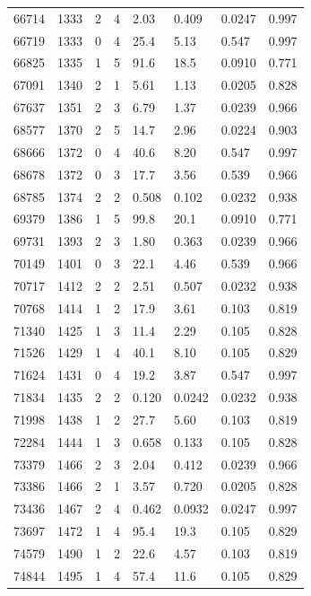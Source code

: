 \documentclass[preview]{standalone}
\begin{document}
{{{{{{{\begin{tabular}{L{1.2cm}C{1.2cm} C{0.3cm}C{0.5cm} C{1.4cm}C{1.4cm} C{1.4cm}C{1.4cm}}
  66714  &  1333  & 2     &  4 &  2.03  & 0.409  & 0.0247 &  0.997   \\ 
  66719  &  1333  & 0     &  4 &  25.4  & 5.13  & 0.547 &  0.997   \\ 
  66825  &  1335  & 1     &  5 &  91.6  & 18.5  & 0.0910 &  0.771   \\ 
  67091  &  1340  & 2     &  1 &  5.61  & 1.13  & 0.0205 &  0.828   \\ 
  67637  &  1351  & 2     &  3 &  6.79  & 1.37  & 0.0239 &  0.966   \\ 
  68577  &  1370  & 2     &  5 &  14.7  & 2.96  & 0.0224 &  0.903   \\ 
  68666  &  1372  & 0     &  4 &  40.6  & 8.20  & 0.547 &  0.997   \\ 
  68678  &  1372  & 0     &  3 &  17.7  & 3.56  & 0.539 &  0.966   \\ 
  68785  &  1374  & 2     &  2 &  0.508  & 0.102  & 0.0232 &  0.938   \\ 
  69379  &  1386  & 1     &  5 &  99.8  & 20.1  & 0.0910 &  0.771   \\ 
  69731  &  1393  & 2     &  3 &  1.80  & 0.363  & 0.0239 &  0.966   \\ 
  70149  &  1401  & 0     &  3 &  22.1  & 4.46  & 0.539 &  0.966   \\ 
  70717  &  1412  & 2     &  2 &  2.51  & 0.507  & 0.0232 &  0.938   \\ 
  70768  &  1414  & 1     &  2 &  17.9  & 3.61  & 0.103 &  0.819   \\ 
  71340  &  1425  & 1     &  3 &  11.4  & 2.29  & 0.105 &  0.828   \\ 
  71526  &  1429  & 1     &  4 &  40.1  & 8.10  & 0.105 &  0.829   \\ 
  71624  &  1431  & 0     &  4 &  19.2  & 3.87  & 0.547 &  0.997   \\ 
  71834  &  1435  & 2     &  2 &  0.120  & 0.0242  & 0.0232 &  0.938   \\ 
  71998  &  1438  & 1     &  2 &  27.7  & 5.60  & 0.103 &  0.819   \\ 
  72284  &  1444  & 1     &  3 &  0.658  & 0.133  & 0.105 &  0.828   \\ 
  73379  &  1466  & 2     &  3 &  2.04  & 0.412  & 0.0239 &  0.966   \\ 
  73386  &  1466  & 2     &  1 &  3.57  & 0.720  & 0.0205 &  0.828   \\ 
  73436  &  1467  & 2     &  4 &  0.462  & 0.0932  & 0.0247 &  0.997   \\ 
  73697  &  1472  & 1     &  4 &  95.4  & 19.3  & 0.105 &  0.829   \\ 
  74579  &  1490  & 1     &  2 &  22.6  & 4.57  & 0.103 &  0.819   \\ 
  74844  &  1495  & 1     &  4 &  57.4  & 11.6  & 0.105 &  0.829   \\ 
\hline 
\end{tabular} 

}}}}}}}
\end{document}

